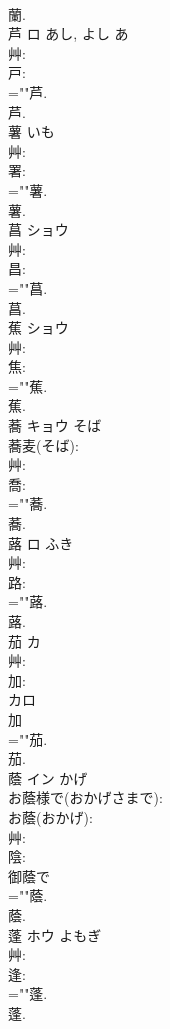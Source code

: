 \documentclass[8pt]{extreport}
\begin{document}
\begin{CJK}{UTF8}{min}
\\	蘭.
\\	芦	ロ	あし, よし	あ	
\\	艸: 
\\	戸: 
\\	=""芦.
\\	芦.
\\	薯		いも				
\\	艸: 
\\	署: 
\\	=""薯.
\\	薯.
\\	菖	ショウ			
\\	艸: 
\\	昌: 
\\	=""菖.
\\	菖.
\\	蕉	ショウ			
\\	艸: 
\\	焦: 
\\	=""蕉.
\\	蕉.
\\	蕎	キョウ	そば		
\\	蕎麦(そば): 
\\	艸: 
\\	喬: 
\\	=""蕎.
\\	蕎.
\\	蕗	ロ	ふき		
\\	艸: 
\\	路: 
\\	=""蕗.
\\	蕗.
\\	茄	カ			
\\	艸: 
\\	加: 
\\	カロ
\\	加
\\	=""茄.
\\	茄.
\\	蔭	イン	かげ		
\\	お蔭様で(おかげさまで): 
\\	お蔭(おかげ): 
\\	艸: 
\\	陰: 
\\	御蔭で 
\\	=""蔭.
\\	蔭.
\\	蓬	ホウ	よもぎ		
\\	艸: 
\\	逢: 
\\	=""蓬.
\\	蓬.

\end{CJK}
\end{document}
